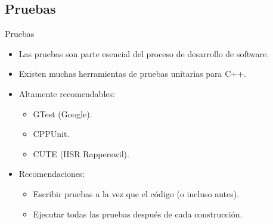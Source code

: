 \subsection{Pruebas}

\begin{frame}{Pruebas}
\begin{itemize}
  \item Las pruebas son parte esencial del proceso de desarrollo de software.
  \item Existen muchas herramientas de pruebas unitarias para C++.
  \item Altamente recomendables:
    \begin{itemize}
      \item GTest (Google).
      \item CPPUnit.
      \item CUTE (HSR Rapperswil).
    \end{itemize}
  \item Recomendaciones:
    \begin{itemize}
      \item Escribir pruebas a la vez que el código (o incluso antes).
      \item Ejecutar todas las pruebas después de cada construcción.
    \end{itemize}
\end{itemize}
\end{frame}
